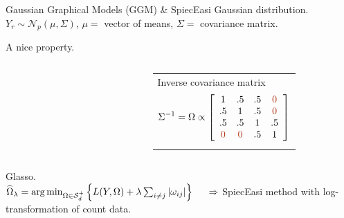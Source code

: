 \documentclass{beamer}
\newcommand{\edgeunit}{1.5}
\newcommand{\emphase}[1]{\textcolor{Complement}{#1}}
\newcommand{\Ncal}{\mathcal{N}}
\begin{document}
\begin{frame}{Gaussian Graphical Models (GGM) \& SpiecEasi}
   \emphase{Gaussian distribution.}\\
   
  $  Y_r \sim \Ncal_p(\mu, \Sigma) $, $\mu =$ vector of means, $\Sigma =$ covariance matrix.
 
  
   \bigskip %
  \emphase{A nice property.} ~ \\

  \begin{columns}
  \begin{column}{0.05\textwidth}
	
\end{column}
  \begin{column}{0.4\textwidth}
    \end{column}
    \begin{column}{12cm}
    \begin{tabular}{p{}}
	 Inverse covariance matrix
	 $$
	 \Sigma^{-1} = \Omega \propto \left[ \begin{array}{cccc}
	   1 & .5 & .5 & \emphase{0} \\
	   .5 & 1 & .5 & \emphase{0} \\
	   .5 & .5 & 1 & .5 \\
	   \emphase{0} & \emphase{0} & .5 & 1
	   \end{array} \right] 
	 $$
    \end{tabular} 
   
  \end{column}
  \end{columns}
 \emphase{Glasso.} ~ \\
 $\widehat{\Omega}_\lambda = \arg\min_{\Omega \in \mathcal{S}_d^+}\left\{ L(Y,\Omega)+\lambda \sum_{i\neq j} |\omega_{ij}| \right\} \hspace{0.5cm} \Rightarrow$ {\color{Nicered}SpiecEasi method} with log-transformation of count data.


\end{frame}
\end{document}

